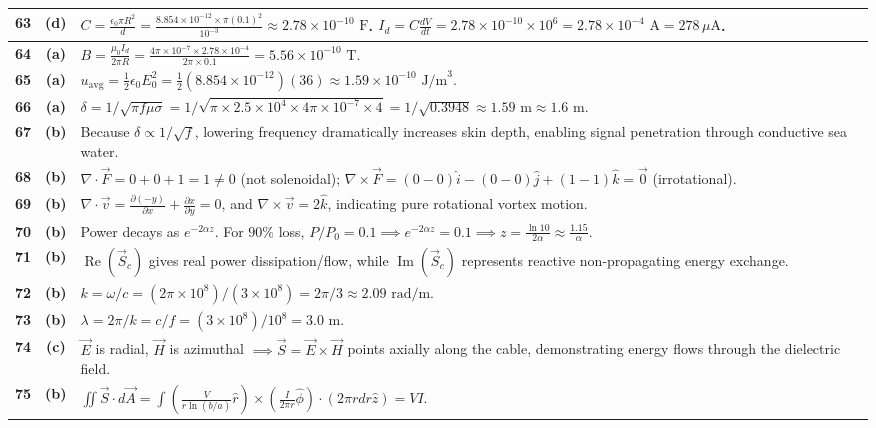 {\begin{tabularx}{\textwidth}{|c|c|X|}
\textbf{63} & \textbf{(d)} & $C = \frac{\epsilon_0 \pi R^2}{d} = \frac{8.854 \times 10^{-12} \times \pi (0.1)^2}{10^{-3}} \approx 2.78 \times 10^{-10}\text{ F}$. $I_d = C \frac{dV}{dt} = 2.78 \times 10^{-10} \times 10^6 = 2.78 \times 10^{-4}\text{ A} = 278\,\mu\text{A}$. \\ \hline
\textbf{64} & \textbf{(a)} & $B = \frac{\mu_0 I_d}{2\pi R} = \frac{4\pi \times 10^{-7} \times 2.78 \times 10^{-4}}{2\pi \times 0.1} = 5.56 \times 10^{-10}\text{ T}$. \\ \hline
\textbf{65} & \textbf{(a)} & $u_{\text{avg}} = \frac{1}{2}\epsilon_0 E_0^2 = \frac{1}{2}(8.854 \times 10^{-12})(36) \approx 1.59 \times 10^{-10}\text{ J/m}^3$. \\ \hline
\textbf{66} & \textbf{(a)} & $\delta = 1/\sqrt{\pi f \mu \sigma} = 1/\sqrt{\pi \times 2.5\times 10^4 \times 4\pi\times 10^{-7} \times 4} = 1/\sqrt{0.3948} \approx 1.59\text{ m} \approx 1.6\text{ m}$. \\ \hline
\textbf{67} & \textbf{(b)} & Because $\delta \propto 1/\sqrt{f}$, lowering frequency dramatically increases skin depth, enabling signal penetration through conductive sea water. \\ \hline
\textbf{68} & \textbf{(b)} & $\nabla \cdot \vec{F} = 0+0+1 = 1 \ne 0$ (not solenoidal); $\nabla \times \vec{F} = (0-0)\hat{i} - (0-0)\hat{j} + (1-1)\hat{k} = \vec{0}$ (irrotational). \\ \hline
\textbf{69} & \textbf{(b)} & $\nabla \cdot \vec{v} = \frac{\partial(-y)}{\partial x} + \frac{\partial x}{\partial y} = 0$, and $\nabla \times \vec{v} = 2\hat{k}$, indicating pure rotational vortex motion. \\ \hline
\textbf{70} & \textbf{(b)} & Power decays as $e^{-2\alpha z}$. For $90\%$ loss, $P/P_0 = 0.1 \implies e^{-2\alpha z} = 0.1 \implies z = \frac{\ln 10}{2\alpha} \approx \frac{1.15}{\alpha}$. \\ \hline
\textbf{71} & \textbf{(b)} & $\operatorname{Re}(\vec{S}_c)$ gives real power dissipation/flow, while $\operatorname{Im}(\vec{S}_c)$ represents reactive non-propagating energy exchange. \\ \hline
\textbf{72} & \textbf{(b)} & $k = \omega/c = (2\pi \times 10^8)/(3 \times 10^8) = 2\pi/3 \approx 2.09\text{ rad/m}$. \\ \hline
\textbf{73} & \textbf{(b)} & $\lambda = 2\pi/k = c/f = (3 \times 10^8)/10^8 = 3.0\text{ m}$. \\ \hline
\textbf{74} & \textbf{(c)} & $\vec{E}$ is radial, $\vec{H}$ is azimuthal $\implies \vec{S} = \vec{E} \times \vec{H}$ points axially along the cable, demonstrating energy flows through the dielectric field. \\ \hline
\textbf{75} & \textbf{(b)} & $\iint \vec{S} \cdot d\vec{A} = \int \left(\frac{V}{r\ln(b/a)}\hat{r}\right) \times \left(\frac{I}{2\pi r}\hat{\phi}\right) \cdot (2\pi r dr \hat{z}) = V I$. \\ \hline
\end{tabularx}
}

